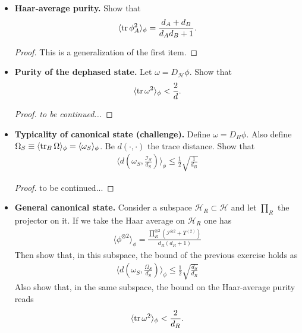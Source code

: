\documentclass{book}
\theoremstyle{definition}
\newcommand{\had}{\mathcal{H}}
\newcommand{\f}[2]{\frac{#1}{#2}}
\newcommand{\lp}{\left(}
\newcommand{\rp}{\right)}
\newcommand{\la}{\langle}
\newcommand{\ra}{\rangle}
\newcommand{\Id}{\mathcal{I}}
\begin{document}
\begin{itemize}
	
	\begin{proof}
		to be continued...
	\end{proof}
	
	\item \textbf{Haar-average purity.} Show that
	\begin{align}
	\langle \tr \phi_A^2 \rangle_\phi = \f{d_A + d_B}{d_A d_B + 1}.
	\end{align}
	
	
	\begin{proof}
		This is a generalization of the first item. 
	\end{proof}


	\item \textbf{Purity of the dephased state.} Let $\omega = D_\had \phi$. Show that 
	\begin{align}
	\la \tr \omega^2 \ra_\phi < \f{2}{d}.
	\end{align}
	
	\begin{proof}
		\textit{to be continued...}
	\end{proof}




	\item \textbf{Typicality of canonical state (challenge).} Define $\omega = D_H \phi$. Also define $\Omega_S \equiv \la \tr_B \Omega \ra_\phi = \la \omega_S\ra_\phi$. Be $d(\cdot,\cdot)$ the trace distance. Show that
	\begin{align}
	\langle d\lp \omega_S, \f{\Id_S}{d_S} \rp \rangle_\phi \leq \f{1}{2}\sqrt{\f{1}{d_B}}
	\end{align}
	
	\begin{proof}
		to be continued... 
	\end{proof}



	\item \textbf{General canonical state.} Consider a subspace $\had_R \subset \had$ and let $\prod_R$ the projector on it. If we take the Haar average on $\had_R$ one has
	\begin{align}
	\la \phi^{\otimes 2}\ra_\phi = \f{\prod_R^{\otimes 2} (\Id^{\otimes 2} + T^{(2)})}{d_R (d_R+1)}
	\end{align}
	Then show that, in this subspace, the bound of the previous exercise holds as
	\begin{align}
	\langle d\lp \omega_S, \f{\Omega_S}{d_S} \rp \rangle_\phi \leq \f{1}{2}\sqrt{\f{d_S}{d_R}}
	\end{align}
	Also show that, in the same subspace, the bound on the Haar-average purity reads
	\begin{align}
	\la \tr \omega^2 \ra_\phi < \f{2}{d_R}.
	\end{align}
\end{itemize}
\end{document}
